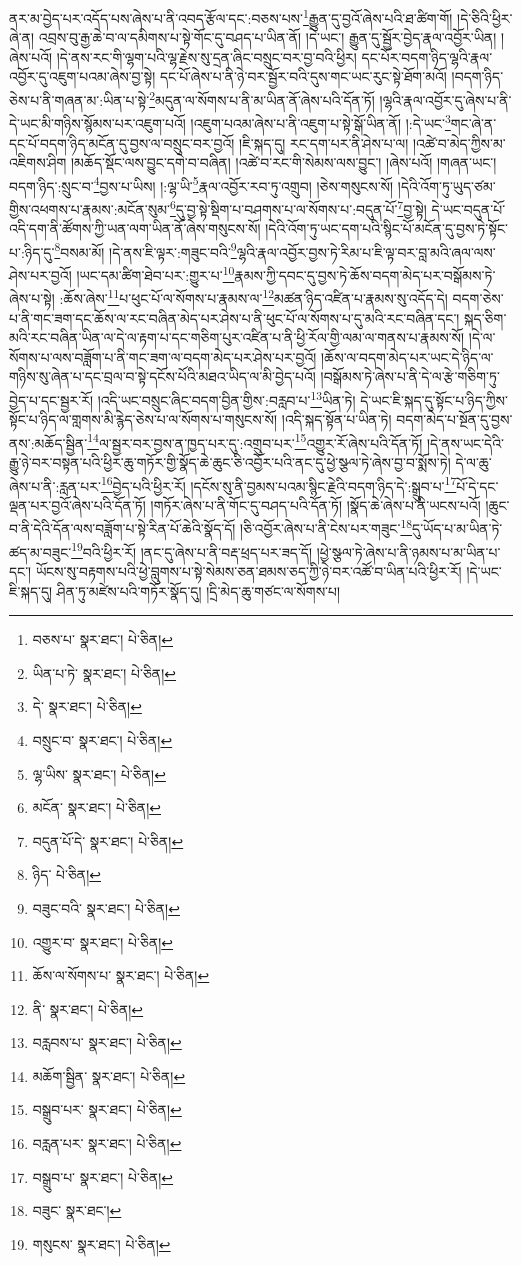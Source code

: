 ནར་མ་བྱེད་པར་འདོད་པས་ཞེས་པ་ནི་འབད་རྩོལ་དང་:བཅས་པས་\footnote{བཅས་པ་  སྣར་ཐང་།  པེ་ཅིན། }རྒྱུན་དུ་བྱའོ་ཞེས་པའི་ཐ་ཚིག་གོ། །དེ་ཅིའི་ཕྱིར་ཞེ་ན། འབྲས་བུ་རྒྱ་ཆེ་བ་ལ་དམིགས་པ་སྟེ་གོང་དུ་བཤད་པ་ཡིན་ནོ། །དེ་ཡང་། རྒྱུན་དུ་སྦྱོར་བྱེད་རྣལ་འབྱོར་ཡིན། །ཞེས་པའོ། །དེ་ནས་རང་གི་ལྷག་པའི་ལྷ་རྗེས་སུ་དྲན་ཞིང་བསྲུང་བར་བྱ་བའི་ཕྱིར། དང་པོར་བདག་ཉིད་ལྷའི་རྣལ་འབྱོར་དུ་འཇུག་པའམ་ཞེས་བྱ་སྟེ། དང་པོ་ཞེས་པ་ནི་ཉེ་བར་སྦྱོར་བའི་དུས་གང་ཡང་རུང་སྟེ་ཐོག་མའོ། །བདག་ཉིད་ཅེས་པ་ནི་གཞན་མ་:ཡིན་པ་སྟེ་\footnote{ཡིན་པ་ཏེ་  སྣར་ཐང་།  པེ་ཅིན། }མདུན་ལ་སོགས་པ་ནི་མ་ཡིན་ནོ་ཞེས་པའི་དོན་ཏོ། །ལྷའི་རྣལ་འབྱོར་དུ་ཞེས་པ་ནི་དེ་ཡང་མི་གཉིས་སྙོམས་པར་འཇུག་པའོ། །འཇུག་པའམ་ཞེས་པ་ནི་འཇུག་པ་སྟེ་སྒོ་ཡིན་ནོ། །:དེ་ཡང་\footnote{དེ་  སྣར་ཐང་།  པེ་ཅིན། }གང་ཞེ་ན་དང་པོ་བདག་ཉིད་མངོན་དུ་བྱས་ལ་བསྲུང་བར་བྱའོ། །ཇི་སྐད་དུ། རང་དག་པར་ནི་ཤེས་པ་ལ། །འཚེ་བ་མེད་ཀྱིས་མ་འཇིགས་ཤིག །མཆོད་སྡོང་ལས་བྱུང་དགེ་བ་བཞིན། །འཚེ་བ་རང་གི་སེམས་ལས་བྱུང་། །ཞེས་པའོ། །གཞན་ཡང་། བདག་ཉིད་:སྲུང་བ་\footnote{བསྲུང་བ་  སྣར་ཐང་།  པེ་ཅིན། }བྱས་པ་ཡིས། །:ལྷ་ཡི་\footnote{ལྷ་ཡིས་  སྣར་ཐང་།  པེ་ཅིན། }རྣལ་འབྱོར་རབ་ཏུ་འགྲུབ། །ཅེས་གསུངས་སོ། །དེའི་འོག་ཏུ་ཡུད་ཙམ་གྱིས་འཕགས་པ་རྣམས་:མངོན་སུམ་\footnote{མངོན་  སྣར་ཐང་།  པེ་ཅིན། }དུ་བྱ་སྟེ་སྡིག་པ་བཤགས་པ་ལ་སོགས་པ་:བདུན་པོ་\footnote{བདུན་པོ་དེ་  སྣར་ཐང་།  པེ་ཅིན། }བྱ་སྟེ། དེ་ཡང་བདུན་པོ་འདི་དག་ནི་ཚོགས་ཀྱི་ཡན་ལག་ཡིན་ནོ་ཞེས་གསུངས་སོ། །དེའི་འོག་ཏུ་ཡང་དག་པའི་སྙིང་པོ་མངོན་དུ་བྱས་ཏེ་སྟོང་པ་:ཉིད་དུ་\footnote{ཉིད་  པེ་ཅིན། }བསམ་མོ། །དེ་ནས་ཇི་ལྟར་:གཟུང་བའི་\footnote{བཟུང་བའི་  སྣར་ཐང་།  པེ་ཅིན། }ལྷའི་རྣལ་འབྱོར་བྱས་ཏེ་རིམ་པ་ཇི་ལྟ་བར་བླ་མའི་ཞལ་ལས་ཤེས་པར་བྱའོ། །ཡང་དམ་ཚིག་ཐེབ་པར་:གྱུར་པ་\footnote{འགྱུར་བ་  སྣར་ཐང་།  པེ་ཅིན། }རྣམས་ཀྱི་དབང་དུ་བྱས་ཏེ་ཆོས་བདག་མེད་པར་བསྒོམས་ཏེ་ཞེས་པ་སྟེ། :ཆོས་ཞེས་\footnote{ཆོས་ལ་སོགས་པ་  སྣར་ཐང་།  པེ་ཅིན། }པ་ཕུང་པོ་ལ་སོགས་པ་རྣམས་ལ་\footnote{ནི་  སྣར་ཐང་།  པེ་ཅིན། }མཚན་ཉིད་འཛིན་པ་རྣམས་སུ་འདོད་དེ། བདག་ཅེས་པ་ནི་གང་ཟག་དང་ཆོས་ལ་རང་བཞིན་མེད་པར་ཤེས་པ་ནི་ཕུང་པོ་ལ་སོགས་པ་དུ་མའི་རང་བཞིན་དང་། སྐད་ཅིག་མའི་རང་བཞིན་ཡིན་ལ་དེ་ལ་རྟག་པ་དང་གཅིག་པུར་འཛིན་པ་ནི་ཕྱི་རོལ་གྱི་ལམ་ལ་གནས་པ་རྣམས་སོ། །དེ་ལ་སོགས་པ་ལས་བཟློག་པ་ནི་གང་ཟག་ལ་བདག་མེད་པར་ཤེས་པར་བྱའོ། །ཆོས་ལ་བདག་མེད་པར་ཡང་དེ་ཉིད་ལ་གཉིས་སུ་ཞེན་པ་དང་བྲལ་བ་སྟེ་དངོས་པོའི་མཐའ་ཡིད་ལ་མི་བྱེད་པའོ། །བསྒོམས་ཏེ་ཞེས་པ་ནི་དེ་ལ་རྩེ་གཅིག་ཏུ་བྱེད་པ་དང་སྦྱར་རོ། །འདི་ཡང་བསྲུང་ཞིང་བདག་བྱིན་གྱིས་:བརླབ་པ་\footnote{བརླབས་པ་  སྣར་ཐང་།  པེ་ཅིན། }ཡིན་ཏེ། དེ་ཡང་ཇི་སྐད་དུ་སྟོང་པ་ཉིད་ཀྱིས་སྟོང་པ་ཉིད་ལ་གླགས་མི་རྙེད་ཅེས་པ་ལ་སོགས་པ་གསུངས་སོ། །འདི་སྐད་སྟོན་པ་ཡིན་ཏེ། བདག་མེད་པ་སྔོན་དུ་བྱས་ནས་:མཆོད་སྦྱིན་\footnote{མཆོག་སྦྱིན་  སྣར་ཐང་།  པེ་ཅིན། }ལ་སྦྱར་བར་བྱས་ན་ཁྱད་པར་དུ་:འགྲུབ་པར་\footnote{བསྒྲུབ་པར་  སྣར་ཐང་།  པེ་ཅིན། }འགྱུར་རོ་ཞེས་པའི་དོན་ཏོ། །དེ་ནས་ཡང་དེའི་རྒྱུ་ཉེ་བར་བསྟན་པའི་ཕྱིར་ཆུ་གཏོར་གྱི་སྣོད་ཆེ་ཆུང་ཅི་འབྱོར་པའི་ནང་དུ་ཕྱེ་སྩལ་ཏེ་ཞེས་བྱ་བ་སྨོས་ཏེ། དེ་ལ་ཆུ་ཞེས་པ་ནི་:རླན་པར་\footnote{བརླན་པར་  སྣར་ཐང་།  པེ་ཅིན། }བྱེད་པའི་ཕྱིར་རོ། །དངོས་སུ་ནི་བྱམས་པའམ་སྙིང་རྗེའི་བདག་ཉིད་དེ་:སྒྲུབ་པ་\footnote{བསྒྲུབ་པ་  སྣར་ཐང་།  པེ་ཅིན། }པོ་དེ་དང་ལྡན་པར་བྱའོ་ཞེས་པའི་དོན་ཏོ། །གཏོར་ཞེས་པ་ནི་གོང་དུ་བཤད་པའི་དོན་ཏོ། །སྣོད་ཆེ་ཞེས་པ་ནི་ཡངས་པའོ། །ཆུང་བ་ནི་དེའི་དོན་ལས་བཟློག་པ་སྟེ་རིན་པོ་ཆེའི་སྣོད་དོ། །ཅི་འབྱོར་ཞེས་པ་ནི་ངེས་པར་གཟུང་\footnote{བཟུང་  སྣར་ཐང་། }དུ་ཡོད་པ་མ་ཡིན་ཏེ་ཚད་མ་བཟུང་\footnote{གསུངས་  སྣར་ཐང་།  པེ་ཅིན། }བའི་ཕྱིར་རོ། །ནང་དུ་ཞེས་པ་ནི་བརྡ་ཕྲད་པར་ཟད་དོ། །ཕྱེ་སྩལ་ཏེ་ཞེས་པ་ནི་ཉམས་པ་མ་ཡིན་པ་དང་། ཡོངས་སུ་བརྟགས་པའི་ཕྱེ་བླུགས་པ་སྟེ་སེམས་ཅན་ཐམས་ཅད་ཀྱི་ཉེ་བར་འཚོ་བ་ཡིན་པའི་ཕྱིར་རོ། །དེ་ཡང་ཇི་སྐད་དུ། ཤིན་ཏུ་མཛེས་པའི་གཏོར་སྣོད་དུ། །དྲི་མེད་ཆུ་གཙང་ལ་སོགས་པ། 